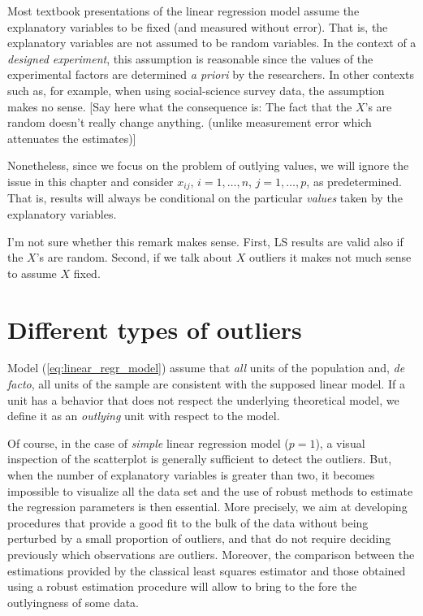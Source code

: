 \begin{stremark}
Most textbook presentations of the linear regression model assume the
explanatory variables to be fixed (and measured without error). That is, the
explanatory variables are not assumed to be random variables. In the context of
a \emph{designed experiment}, this assumption is reasonable since the values of
the experimental factors are determined \emph{a priori} by the researchers. In
other contexts such as, for example, when using social-science survey data, the
assumption makes no sense. \alert{[Say here what the consequence is: The fact
that the $X$'s are random doesn't really change anything. (unlike measurement
error which attenuates the estimates)]}

Nonetheless, since we focus on the problem of outlying values, we will ignore
the issue in this chapter and consider $x_{ij}$, $i = 1, \dots, n$, $j = 1,
\dots, p$, as predetermined. That is, results will always be conditional on the
particular \emph{values} taken by the explanatory variables.

\alert{I'm not sure whether this remark makes sense. First, LS results are
valid also if the $X$'s are random. Second, if we talk about $X$ outliers it
makes not much sense to assume $X$ fixed.}
\end{stremark}


\section{Different types of outliers}

Model (\ref{eq:linear_regr_model}) assume that \emph{all} units of the
population and, \emph{de facto}, all units of the sample are consistent with
the supposed linear model. If a unit has a behavior that does not respect the
underlying theoretical model, we define it as an \emph{outlying} unit with
respect to the model.

Of course, in the case of \emph{simple} linear regression model ($p=1$), a
visual inspection of the scatterplot is generally sufficient to detect the
outliers. But, when the number of explanatory variables is greater than two,
it becomes impossible to visualize all the data set and the use of robust
methods to estimate the regression parameters is then essential. More
precisely, we aim at developing procedures that provide a good fit to the bulk
of the data without being perturbed by a small proportion of outliers, and
that do not require deciding previously which observations are outliers.
Moreover, the comparison between the estimations provided by the classical
least squares estimator and those obtained using a robust estimation procedure
will allow to bring to the fore the outlyingness of some data.

